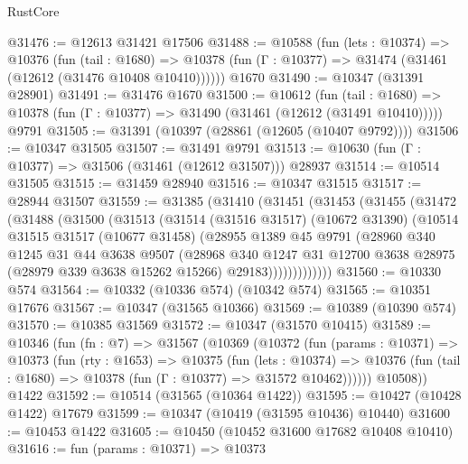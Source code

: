 \begin{lexlean}{RustCore}
\begin{coremodule}
@31476 := @12613 @31421 @17506
@31488 := @10588
    (fun (lets : @10374) =>
    @10376
      (fun (tail : @1680) =>
      @10378 (fun (Γ : @10377) => @31474 (@31461 (@12612 (@31476 @10408 @10410))))))
    @1670
@31490 := @10347 (@31391 @28901)
@31491 := @31476 @1670
@31500 := @10612
    (fun (tail : @1680) => @10378 (fun (Γ : @10377) => @31490 (@31461 (@12612 (@31491 @10410)))))
    @9791
@31505 := @31391 (@10397 (@28861 (@12605 (@10407 @9792))))
@31506 := @10347 @31505
@31507 := @31491 @9791
@31513 := @10630 (fun (Γ : @10377) => @31506 (@31461 (@12612 @31507))) @28937
@31514 := @10514 @31505
@31515 := @31459 @28940
@31516 := @10347 @31515
@31517 := @28944 @31507
@31559 := @31385
    (@31410
      (@31451
        (@31453
          (@31455
            (@31472
              (@31488
                (@31500
                  (@31513
                    (@31514
                      (@31516 @31517)
                      (@10672 @31390)
                      (@10514
                        @31515
                        @31517
                        (@10677 @31458)
                        (@28955
                          @1389
                          @45
                          @9791
                          (@28960
                            @340
                            @1245
                            @31
                            @44
                            @3638
                            @9507
                            (@28968
                              @340
                              @1247
                              @31
                              @12700
                              @3638
                              @28975
                              (@28979 @339 @3638 @15262 @15266)
                              @29183)))))))))))))
@31560 := @10330 @574
@31564 := @10332 (@10336 @574) (@10342 @574)
@31565 := @10351 @17676
@31567 := @10347 (@31565 @10366)
@31569 := @10389 (@10390 @574)
@31570 := @10385 @31569
@31572 := @10347 (@31570 @10415)
@31589 := @10346
    (fun (fn : @7) =>
    @31567
      (@10369
        (@10372
          (fun (params : @10371) =>
          @10373
            (fun (rty : @1653) =>
            @10375
              (fun (lets : @10374) =>
              @10376 (fun (tail : @1680) => @10378 (fun (Γ : @10377) => @31572 @10462))))))
        @10508))
    @1422
@31592 := @10514 (@31565 (@10364 @1422))
@31595 := @10427 (@10428 @1422) @17679
@31599 := @10347 (@10419 (@31595 @10436) @10440)
@31600 := @10453 @1422
@31605 := @10450 (@10452 @31600 @17682 @10408 @10410)
@31616 := fun (params : @10371) =>
  @10373

\end{coremodule}
\end{lexlean}
